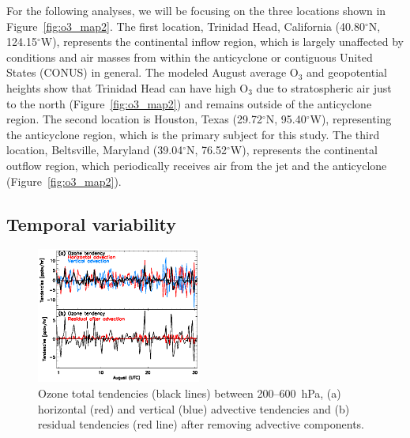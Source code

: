 For the following analyses, we will be focusing on the three locations shown in Figure~\ref{fig:o3_map2}.
The first location,  Trinidad Head, California (40.80$^\circ$N, 124.15$^\circ$W), represents the
continental inflow region, which is largely unaffected by conditions and air masses from within the
anticyclone or contiguous United States (CONUS) in general. The modeled August average O$_3$ and geopotential heights
show that Trinidad Head can have high O$_3$ due to stratospheric air just to the north
(Figure~\ref{fig:o3_map2}) and remains outside of the anticyclone region.
The second location is Houston, Texas (29.72$^\circ$N,
95.40$^\circ$W), representing the anticyclone region, which is the primary subject for this study.
The third location, Beltsville, Maryland (39.04$^\circ$N, 76.52$^\circ$W), represents
the continental outflow region, which periodically receives air from the jet and
the anticyclone (Figure~\ref{fig:o3_map2}).

\subsection{Temporal variability}

\begin{figure}
	\centering
	\begin{singlespacing}
	\includegraphics[width=0.48\textwidth]{Figures/tendency_res.eps}
	\caption[Ozone total, advective, and residual tendencies]{{\small
	Ozone total tendencies (black lines) between 200--600~hPa, (a) horizontal (red) and vertical (blue) advective tendencies and (b)
	residual tendencies (red line) after removing advective components.}}
	\label{fig:tend_res}
	\end{singlespacing}
\end{figure}

